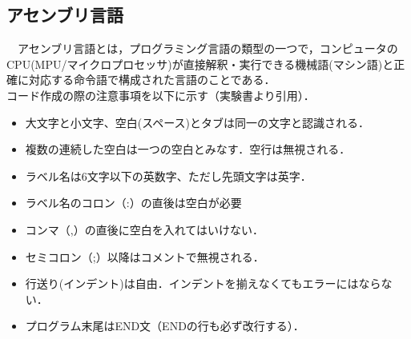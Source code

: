 \subsection{アセンブリ言語}
　アセンブリ言語とは，プログラミング言語の類型の一つで，コンピュータのCPU(MPU/マイクロプロセッサ)が直接解釈・実行できる機械語(マシン語)と正確に対応する命令語で構成された言語のことである．\cite{assembly}\\
コード作成の際の注意事項を以下に示す（実験書より引用）．
\begin{itemize}
    \item 大文字と小文字、空白(スペース)とタブは同一の文字と認識される．
    \item 複数の連続した空白は一つの空白とみなす．空行は無視される．
    \item ラベル名は6文字以下の英数字、ただし先頭文字は英字．
    \item ラベル名のコロン（:）の直後は空白が必要
    \item コンマ（,）の直後に空白を入れてはいけない．
    \item セミコロン（;）以降はコメントで無視される．
    \item 行送り(インデント)は自由．インデントを揃えなくてもエラーにはならない．
    \item プログラム末尾はEND文（ENDの行も必ず改行する）．
\end{itemize}

